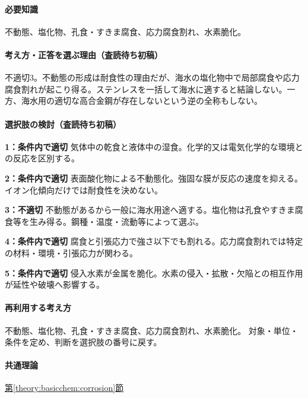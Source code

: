 \paragraph{必要知識} 不動態、塩化物、孔食・すきま腐食、応力腐食割れ、水素脆化。

\paragraph{考え方・正答を選ぶ理由（査読待ち初稿）} 不適切3。不動態の形成は耐食性の理由だが、海水の塩化物中で局部腐食や応力腐食割れが起こり得る。ステンレスを一括して海水に適すると結論しない。一方、海水用の適切な高合金鋼が存在しないという逆の全称もしない。

\paragraph{選択肢の検討（査読待ち初稿）}\mbox{}\par

\noindent\textbf{1：条件内で適切} 気体中の乾食と液体中の湿食。化学的又は電気化学的な環境との反応を区別する。\par

\noindent\textbf{2：条件内で適切} 表面酸化物による不動態化。強固な膜が反応の速度を抑える。イオン化傾向だけでは耐食性を決めない。\par

\noindent\textbf{3：不適切} 不動態があるから一般に海水用途へ適する。塩化物は孔食やすきま腐食等を生み得る。鋼種・温度・流動等によって選ぶ。\par

\noindent\textbf{4：条件内で適切} 腐食と引張応力で強さ以下でも割れる。応力腐食割れでは特定の材料・環境・引張応力が関わる。\par

\noindent\textbf{5：条件内で適切} 侵入水素が金属を脆化。水素の侵入・拡散・欠陥との相互作用が延性や破壊へ影響する。\par

\paragraph{再利用する考え方} 不動態、塩化物、孔食・すきま腐食、応力腐食割れ、水素脆化。 対象・単位・条件を定め、判断を選択肢の番号に戻す。

\paragraph{共通理論} \hyperref[theory:basicchem:corrosion]{第\ref*{theory:basicchem:corrosion}節}


